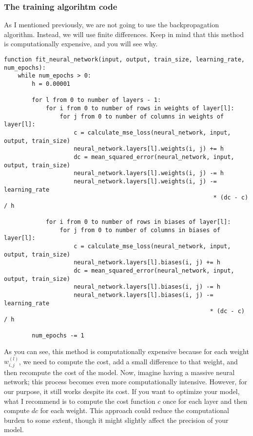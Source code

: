 \subsubsection{The training algorihtm code}
As I mentioned previously, we are not going to use the backpropagation algorithm. Instead, we will use
finite differences. Keep in mind that this method is computationally expensive, and you will see why.
\begin{verbatim}
function fit_neural_network(input, output, train_size, learning_rate, num_epochs):
    while num_epochs > 0:
        h = 0.00001
        
        for l from 0 to number of layers - 1:
            for i from 0 to number of rows in weights of layer[l]:
                for j from 0 to number of columns in weights of layer[l]:
                    c = calculate_mse_loss(neural_network, input, output, train_size)
                    neural_network.layers[l].weights(i, j) += h
                    dc = mean_squared_error(neural_network, input, output, train_size)
                    neural_network.layers[l].weights(i, j) -= h
                    neural_network.layers[l].weights(i, j) -= learning_rate
                                                            * (dc - c) / h
                
            for i from 0 to number of rows in biases of layer[l]:
                for j from 0 to number of columns in biases of layer[l]:
                    c = calculate_mse_loss(neural_network, input, output, train_size)
                    neural_network.layers[l].biases(i, j) += h
                    dc = mean_squared_error(neural_network, input, output, train_size)
                    neural_network.layers[l].biases(i, j) -= h
                    neural_network.layers[l].biases(i, j) -= learning_rate
                                                           * (dc - c) / h
        
        num_epochs -= 1
\end{verbatim}
As you can see, this method is computationally expensive because for each weight $w_{i, j}^{(l)}$, we
need to compute the cost, add a small difference to that weight, and then recompute the cost of the model.
Now, imagine having a massive neural network; this process becomes even more computationally intensive.
However, for our purpose, it still works despite its cost. If you want to optimize your model, what I
recommend is to compute the cost function $c$ once for each layer and then compute $dc$ for each weight. This
approach could reduce the computational burden to some extent, though it might slightly affect the precision
of your model.

